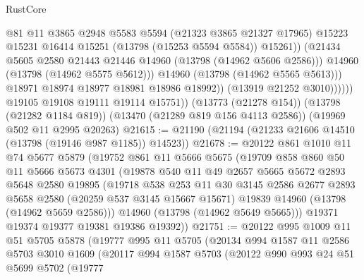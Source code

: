 \begin{lexlean}{RustCore}
\begin{coremodule}
                              @81
                              @11
                              @3865
                              @2948
                              @5583
                              @5594
                              (@21323 @3865 @21327 @17965)
                              @15223
                              @15231
                              @16414
                              @15251
                              (@13798 (@15253 @5594 @5584))
                              @15261))
                          (@21434 @5605 @2580 @21443 @21446 @14960 (@13798 (@14962 @5606 @2586)))
                          @14960
                          (@13798 (@14962 @5575 @5612)))
                        @14960
                        (@13798 (@14962 @5565 @5613)))
                      @18971
                      @18974
                      @18977
                      @18981
                      @18986
                      @18992))
                  (@13919 @21252 @3010))))))
        @19105
        @19108
        @19111
        @19114
        @15751))
    (@13773 (@21278 @154))
    (@13798 (@21282 @1184 @819))
    (@13470 (@21289 @819 @156 @4113 @2586))
    (@19969 @502 @11 @2995 @20263)
@21615 := @21190 (@21194 (@21233 @21606 @14510 (@13798 (@19146 @987 @1185)) @14523))
@21678 := @20122
    @861
    @1010
    @11
    @74
    @5677
    @5879
    (@19752
      @861
      @11
      @5666
      @5675
      (@19709
        @858
        @860
        @50
        @11
        @5666
        @5673
        @4301
        (@19878
          @540
          @11
          @49
          @2657
          @5665
          @5672
          @2893
          @5648
          @2580
          @19895
          (@19718
            @538
            @253
            @11
            @30
            @3145
            @2586
            @2677
            @2893
            @5658
            @2580
            (@20259 @537 @3145 @15667 @15671)
            @19839
            @14960
            (@13798 (@14962 @5659 @2586)))
          @14960
          (@13798 (@14962 @5649 @5665)))
        @19371
        @19374
        @19377
        @19381
        @19386
        @19392))
@21751 := @20122
    @995
    @1009
    @11
    @51
    @5705
    @5878
    (@19777
      @995
      @11
      @5705
      (@20134
        @994
        @1587
        @11
        @2586
        @5703
        @3010
        @1609
        (@20117
          @994
          @1587
          @5703
          (@20122
            @990
            @993
            @24
            @51
            @5699
            @5702
            (@19777

\end{coremodule}
\end{lexlean}
